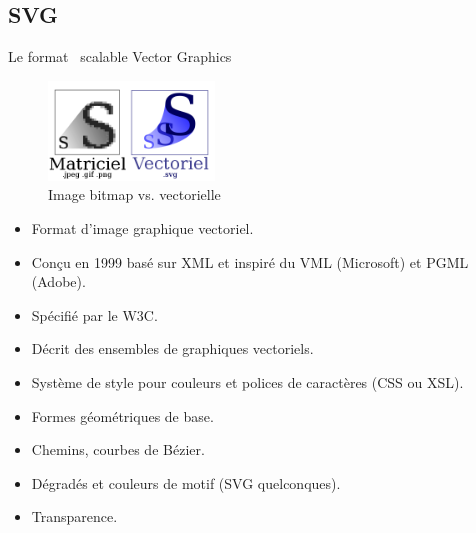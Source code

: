 \documentclass[14pt]{beamer}
\begin{document}
\subsection{SVG}
\begin{frame}[allowframebreaks]{Le format \subsecname~scalable Vector Graphics}
    \begin{figure}
    \centering
    \includegraphics[height=100px]{image_bitmap_svg}
    \caption{Image bitmap vs. vectorielle}
    \end{figure}
    \begin{itemize}
        \item Format d'image graphique vectoriel.
        \item Conçu en 1999 basé sur XML et inspiré du VML (Microsoft) et PGML (Adobe).
        \item Spécifié par le W3C.
        \item Décrit des ensembles de graphiques vectoriels.
        \item Système de style pour couleurs et polices de caractères (CSS ou XSL).
        \item Formes géométriques de base.
        \item Chemins, courbes de Bézier.
        \item Dégradés et couleurs de motif (SVG quelconques).
        \item Transparence.
    \end{itemize}
\end{frame}



\end{document}
